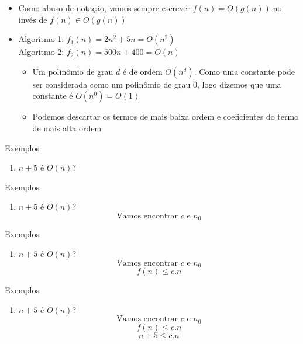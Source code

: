 \documentclass{beamer}
\begin{document}
\begin{frame}

\begin{itemize}
 \item Como abuso de notação, vamos sempre escrever $f(n) = O(g(n))$ ao invés de $f(n) \in O(g(n))$
 \item Algoritmo 1: $f_1(n) = 2n^2 + 5n = O(n^2)$\\
 Algoritmo 2: $f_2(n) = 500n + 400 = O(n)$
 \begin{itemize}
  \item Um polinômio de grau $d$ é de ordem $O(n^d)$. Como uma constante pode ser considerada como um polinômio de grau 0, logo dizemos que uma constante é $O(n^0) = O(1)$
  \item Podemos descartar os termos de mais baixa ordem e coeficientes do termo de mais alta ordem
 \end{itemize}

\end{itemize}

\end{frame}

 \begin{frame}{Exemplos}
    \begin{enumerate}
     \item $n+5$ é $O(n)$?
    \end{enumerate}
\end{frame}
 
 \begin{frame}{Exemplos}
    \begin{enumerate}
     \item $n+5$ é $O(n)$?
     $$\text{Vamos encontrar } c \text{ e } n_0 $$

    \end{enumerate}
\end{frame}

\begin{frame}{Exemplos}
    \begin{enumerate}
     \item $n+5$ é $O(n)$?
     $$\text{Vamos encontrar } c \text{ e } n_0 $$
     $$f(n) \leq c.n$$
   
    \end{enumerate}
\end{frame}

\begin{frame}{Exemplos}
    \begin{enumerate}
     \item $n+5$ é $O(n)$?
     $$\text{Vamos encontrar } c \text{ e } n_0 $$
     $$f(n) \leq c.n$$
     $$n+5 \leq c.n$$
   
    \end{enumerate}
\end{frame}
\end{document}
